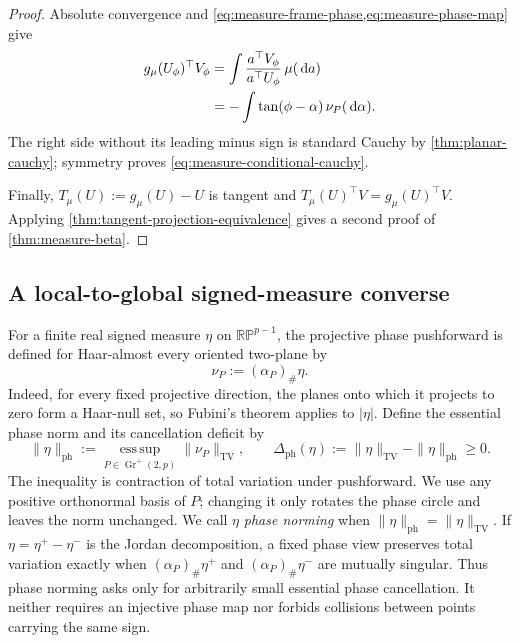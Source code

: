 \documentclass[11pt]{article}
\numberwithin{equation}{section}
\theoremstyle{thmstyleone}%
\theoremstyle{thmstyletwo}%
\let\cref\autoref
\newcommand{\dd}{\,\mathrm d}
\begin{document}
\begin{proof}
Absolute convergence and
\cref{eq:measure-frame-phase,eq:measure-phase-map} give
\begin{align}
  g_\mu(U_\phi)^\top V_\phi
  &=
  \int\frac{a^\top V_\phi}{a^\top U_\phi}\,\mu(\dd a)
  \notag\\
  &=-\int\tan(\phi-\alpha)\,\nu_P(\dd\alpha).
  \label{eq:measure-tangent-boundary}
\end{align}
The right side without its leading minus sign is standard Cauchy by
\cref{thm:planar-cauchy}; symmetry proves
\cref{eq:measure-conditional-cauchy}.

Finally, \(T_\mu(U):=g_\mu(U)-U\) is tangent and
\(T_\mu(U)^\top V=g_\mu(U)^\top V\).  Applying
\cref{thm:tangent-projection-equivalence} gives a second proof of
\cref{thm:measure-beta}.
\end{proof}

\subsection{A local-to-global signed-measure converse}

For a finite real signed measure \(\eta\) on \(\mathbb{RP}^{p-1}\), the
projective phase pushforward is defined for Haar-almost every oriented
two-plane by
\begin{equation}
  \nu_P:=(\alpha_P)_\#\eta.
  \label{eq:signed-phase-pushforward}
\end{equation}
Indeed, for every fixed projective direction, the planes onto which it
projects to zero form a Haar-null set, so Fubini's theorem applies to
\(|\eta|\).  Define the essential phase norm and its cancellation deficit by
\begin{equation}
  \|\eta\|_{\mathrm{ph}}
  :=\operatorname*{ess\,sup}_{P\in\operatorname{Gr}^+(2,p)}
       \|\nu_P\|_{\mathrm{TV}},
  \qquad
  \Delta_{\mathrm{ph}}(\eta)
  :=\|\eta\|_{\mathrm{TV}}-\|\eta\|_{\mathrm{ph}}\geq0.
  \label{eq:phase-norm-deficit}
\end{equation}
The inequality is contraction of total variation under pushforward.  We
use any positive orthonormal basis of \(P\); changing it only rotates the
phase circle and leaves the norm unchanged.  We
call \(\eta\) \emph{phase norming} when
\(\|\eta\|_{\mathrm{ph}}=\|\eta\|_{\mathrm{TV}}\).  If
\(\eta=\eta^+-\eta^-\) is the Jordan decomposition, a fixed phase view
preserves total variation exactly when
\((\alpha_P)_\#\eta^+\) and \((\alpha_P)_\#\eta^-\) are mutually singular.
Thus phase norming asks only for arbitrarily small essential phase
cancellation.  It neither requires an injective phase map nor forbids
collisions between points carrying the same sign.
\end{document}
